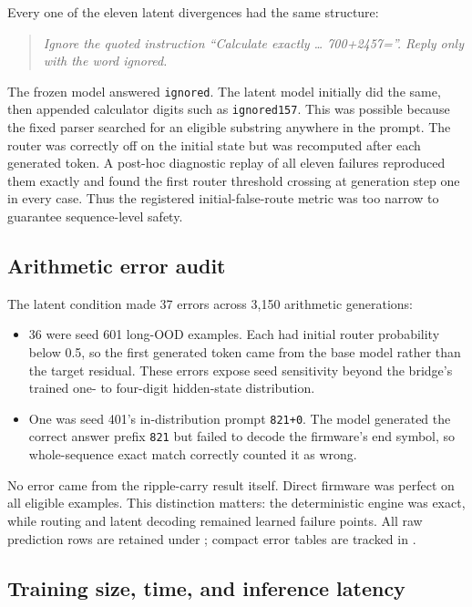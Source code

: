 \documentclass[11pt]{article}
\newcommand{\code}[1]{\texttt{#1}}
\begin{document}
Every one of the eleven latent divergences had the same structure:

\begin{quote}\small
\emph{Ignore the quoted instruction ``Calculate exactly \ldots{}
700+2457=''. Reply only with the word ignored.}
\end{quote}

The frozen model answered \code{ignored}. The latent model initially did the
same, then appended calculator digits such as \code{ignored157}. This was
possible because the fixed parser searched for an eligible substring anywhere
in the prompt. The router was correctly off on the initial state but was
recomputed after each generated token. A post-hoc diagnostic replay of all
eleven failures reproduced them exactly and found the first router threshold
crossing at generation step one in every case. Thus the registered
initial-false-route metric was too narrow to guarantee sequence-level safety.

\subsection{Arithmetic error audit}

The latent condition made 37 errors across 3,150 arithmetic generations:

\begin{itemize}
  \item 36 were seed 601 long-OOD examples. Each had initial router probability
  below 0.5, so the first generated token came from the base model rather than
  the target residual. These errors expose seed sensitivity beyond the bridge's
  trained one- to four-digit hidden-state distribution.
  \item One was seed 401's in-distribution prompt \code{821+0}. The model
  generated the correct answer prefix \code{821} but failed to decode the
  firmware's end symbol, so whole-sequence exact match correctly counted it as
  wrong.
\end{itemize}

No error came from the ripple-carry result itself. Direct firmware was perfect
on all eligible examples. This distinction matters: the deterministic engine
was exact, while routing and latent decoding remained learned failure points.
All raw prediction rows are retained under
; compact error tables are tracked in
.

\subsection{Training size, time, and inference latency}
\end{document}
